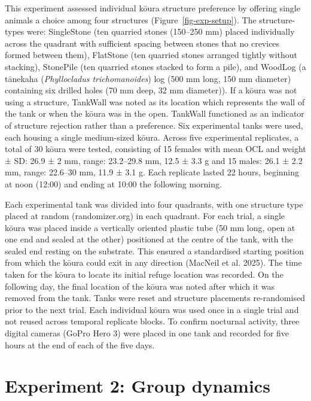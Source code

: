 \documentclass[
  12pt,
  a4paper,
]{scrbook}
\begin{document}
This experiment assessed individual kōura structure preference by
offering single animals a choice among four structures
(Figure~\ref{fig-exp-setup}). The structure-types were: SingleStone (ten
quarried stones (150--250 mm) placed individually across the quadrant
with sufficient spacing between stones that no crevices formed between
them), FlatStone (ten quarried stones arranged tightly without
stacking), StonePile (ten quarried stones stacked to form a pile), and
WoodLog (a tānekaha (\emph{Phyllocladus trichomanoides}) log (500 mm
long, 150 mm diameter) containing six drilled holes (70 mm deep, 32 mm
diameter)). If a kōura was not using a structure, TankWall was noted as
its location which represents the wall of the tank or when the kōura was
in the open. TankWall functioned as an indicator of structure rejection
rather than a preference. Six experimental tanks were used, each housing
a single medium-sized kōura. Across five experimental replicates, a
total of 30 kōura were tested, consisting of 15 females with mean OCL
and weight ± SD: 26.9 ± 2 mm, range: 23.2--29.8 mm, 12.5 ± 3.3 g and 15
males: 26.1 ± 2.2 mm, range: 22.6--30 mm, 11.9 ± 3.1 g. Each replicate
lasted 22 hours, beginning at noon (12:00) and ending at 10:00 the
following morning.

Each experimental tank was divided into four quadrants, with one
structure type placed at random (randomizer.org) in each quadrant. For
each trial, a single kōura was placed inside a vertically oriented
plastic tube (50 mm long, open at one end and sealed at the other)
positioned at the centre of the tank, with the sealed end resting on the
substrate. This ensured a standardised starting position from which the
kōura could exit in any direction (MacNeil et al. 2025). The time taken
for the kōura to locate its initial refuge location was recorded. On the
following day, the final location of the kōura was noted after which it
was removed from the tank. Tanks were reset and structure placements
re-randomised prior to the next trial. Each individual kōura was used
once in a single trial and not reused across temporal replicate blocks.
To confirm nocturnal activity, three digital cameras (GoPro Hero 3) were
placed in one tank and recorded for five hours at the end of each of the
five days.

\section{Experiment 2: Group
dynamics}\label{experiment-2-group-dynamics}
\end{document}
